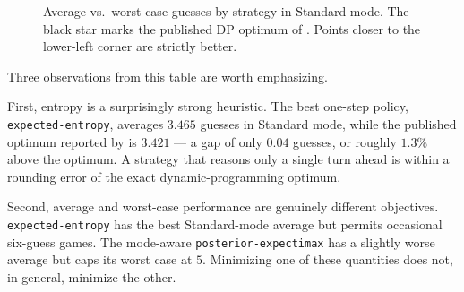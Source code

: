 \documentclass[11pt]{article}
\begin{document}
\begin{figure}[h]
\centering
{}
\caption{Average vs.\ worst-case guesses by strategy in Standard mode.
The black star marks the published DP optimum of
\citet{bertsimas2022wordle,selby2022wordle}. Points closer to the
lower-left corner are strictly better.}
\label{fig:scatter}
\end{figure}

Three observations from this table are worth emphasizing.

First, entropy is a surprisingly strong heuristic. The best one-step
policy, \texttt{expected-entropy}, averages $3.465$ guesses in
Standard mode, while the published optimum reported by
\citet{bertsimas2022wordle} is $3.421$ --- a gap of only $0.04$
guesses, or roughly $1.3\%$ above the optimum. A strategy that reasons
only a single turn ahead is within a rounding error of the exact
dynamic-programming optimum.

Second, average and worst-case performance are genuinely different
objectives. \texttt{expected-entropy} has the best Standard-mode
average but permits occasional six-guess games. The mode-aware
\texttt{posterior-expectimax} has a slightly worse average but caps
its worst case at $5$. Minimizing one of these quantities does not,
in general, minimize the other.
\end{document}
